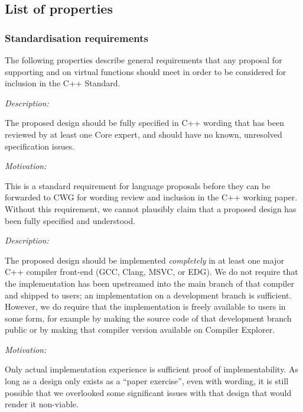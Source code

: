 \subsection{List of properties}


\subsubsection{Standardisation requirements}

The following properties describe general requirements that any proposal for supporting  and  on virtual functions should meet in order to be considered for inclusion in the C++ Standard.


\emph{Description:}

The proposed design should be fully specified in C++ wording that has been reviewed by at least one Core expert, and should have no known, unresolved specification issues.

\emph{Motivation:}

 This is a standard requirement for language proposals before they can be forwarded to CWG for wording review and inclusion in the C++ working paper.  Without this requirement, we cannot plausibly claim that a proposed design has been fully specified and understood.


\emph{Description:}

The proposed design should be implemented \emph{completely} in at least one major C++ compiler front-end (GCC, Clang, MSVC, or EDG). We do not require that the implementation has been upstreamed into the main branch of that compiler and shipped to users; an implementation on a development branch is sufficient. However, we do require that the implementation is freely available to users in some form, for example by making the source code of that development branch public or by making that compiler version available on Compiler Explorer.

\emph{Motivation:}

Only actual implementation experience is sufficient proof of implementability. As long as a design only exists as a ``paper exercise'', even with wording, it is still possible that we overlooked some significant issues with that design that would render it non-viable.


